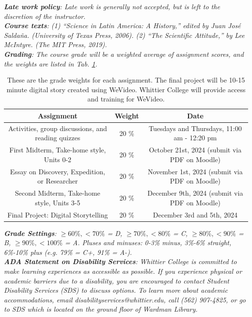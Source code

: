 \documentclass[10pt]{article}
\begin{document}
\textit{\textbf{Late work policy}: Late work is generally not accepted, but is left to the discretion of the instructor.} \\
\textit{\textbf{Course texts}: (1) ``Science in Latin America: A History,'' edited by Juan Jos\'{e} Salda\~{n}a.  (University of Texas Press, 2006). (2) ``The Scientific Attitude,'' by Lee McIntyre. (The MIT Press, 2019).} \\
\textit{\textbf{Grading}: The course grade will be a weighted average of assignment scores, and the weights are listed in Tab. \ref{tab:grades}.}
\begin{table}
\centering
\begin{tabular}{| c | c | c |}
\hline
\textbf{Assignment} & \textbf{Weight} & \textbf{Date} \\ \hline
Activities, group discussions, and reading quizzes & 20 \% & Tuesdays and Thursdays, 11:00 am - 12:20 pm \\ \hline
First Midterm, Take-home style, Units 0-2 & 20 \% & October 21st, 2024 (submit via PDF on Moodle) \\ \hline
Essay on Discovery, Expedition, or Researcher & 20 \% & November 1st, 2024 (submit via PDF on Moodle) \\ \hline
Second Midterm, Take-home style, Units 3-5 & 20 \% & December 9th, 2024 (submit via PDF on Moodle) \\ \hline
Final Project: Digital Storytelling & 20 \% & December 3rd and 5th, 2024 \\ \hline
\end{tabular}
\caption{\label{tab:grades} These are the grade weights for each assignment. The final project will be 10-15 minute digital story created using WeVideo.  Whittier College will provide access and training for WeVideo.}
\end{table}
\noindent
\textit{\textbf{Grade Settings}: $\geq 60\%, <70\%$ = D, $\geq 70\%, <80\%$ = C, $\geq 80\%, <90\%$ = B, $\geq 90\%, <100\%$ = A. Pluses and minuses: 0-3\% minus, 3\%-6\% straight, 6\%-10\% plus (e.g. 79\% = C+, 91\% = A-).} \\
\textit{\textbf{ADA Statement on Disability Services}: Whittier College is committed to make learning experiences as accessible as possible. If you experience physical or academic barriers due to a disability, you are encouraged to contact Student Disability Services (SDS) to discuss options. To learn more about academic accommodations, email disabilityservices@whittier.edu, call (562) 907-4825, or go to SDS which is located on the ground floor of Wardman Library.} \\
\end{document}
